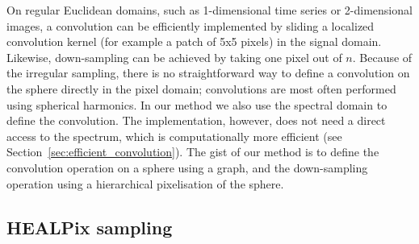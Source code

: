 \documentclass[final,twocolumn,3p,times,authoryear]{elsarticle}
\newcommand{\TK}[1]{{\color{red}{TK:#1}}}
\newcommand{\secref}[1]{Section~\ref{sec:#1}}
\newcommand{\1}{\b{1}}              %
\newcommand{\0}{\b{0}}              %
\begin{document}
On regular Euclidean domains, such as 1-dimensional time series or 2-dimensional images, a convolution can be efficiently implemented by sliding a localized convolution kernel (for example a patch of 5x5 pixels) in the signal domain.
Likewise, down-sampling can be achieved by taking one pixel out of $n$.
Because of the irregular sampling, there is no straightforward way to define a convolution on the sphere directly in the pixel domain; convolutions are most often performed using spherical harmonics.
In our method we also use the spectral domain to define the convolution.
The implementation, however, does not need a direct access to the spectrum, which is computationally more efficient (see \secref{efficient_convolution}).
The gist of our method is to define the convolution operation on a sphere using a graph, and the down-sampling operation using a hierarchical pixelisation of the sphere.


\subsection{HEALPix sampling}
\label{sec:healpix}


\end{document}
